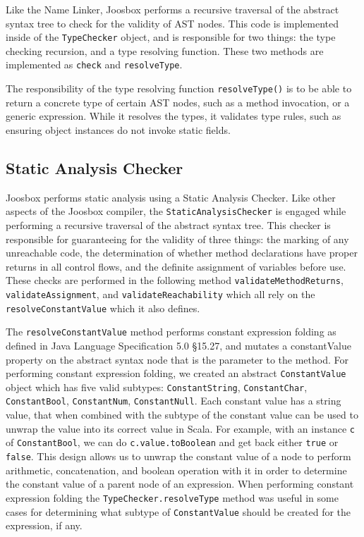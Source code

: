 \documentclass[letterpaper]{article}
\begin{document}
  Like the Name Linker, Joosbox performs a recursive traversal of the abstract
  syntax tree to check for the validity of AST nodes. This code is implemented
  inside of the {\tt TypeChecker} object, and is responsible for two things: the
  type checking recursion, and a type resolving function. These two methods are
  implemented as {\tt check} and {\tt resolveType}.

  The responsibility of the type resolving function {\tt resolveType()} is to be
  able to return a concrete type of certain AST nodes, such as a method
  invocation, or a generic expression. While it resolves the types, it validates
  type rules, such as ensuring object instances do not invoke static fields.


  \subsection{Static Analysis Checker}

  Joosbox performs static analysis using a Static Analysis Checker. Like other
  aspects of the Joosbox compiler, the {\tt StaticAnalysisChecker} is engaged 
  while performing a recursive traversal of the abstract syntax tree. This
  checker is responsible for guaranteeing for the validity of three things: the
  marking of any unreachable code, the determination of whether method
  declarations have proper returns in all control flows, and the definite
  assignment of variables before use. These checks are performed in the
  following method {\tt validateMethodReturns},
  {\tt validateAssignment}, and {\tt validateReachability}
  which all rely on the {\tt resolveConstantValue} which it also defines.

  The {\tt resolveConstantValue} method performs constant expression folding as
  defined in  Java Language Specification 5.0 \S 15.27, and mutates a
  constantValue property on the abstract syntax node that is the parameter to
  the method. For performing constant expression folding, we created an abstract
  {\tt ConstantValue} object which has five valid subtypes: {\tt ConstantString},
  {\tt ConstantChar}, {\tt ConstantBool}, {\tt ConstantNum}, {\tt ConstantNull}.
  Each constant value has a string value, that when combined with the subtype of
  the constant value can be used to unwrap the value into its correct value in
  Scala. For example, with an instance {\tt c} of {\tt ConstantBool}, we can do
  {\tt c.value.toBoolean} and get back either {\tt true} or {\tt false}. This
  design allows us to unwrap the constant value of a node to perform arithmetic,
  concatenation, and boolean operation with it in order to determine the
  constant value of a parent node of an expression. When performing constant
  expression folding the {\tt TypeChecker.resolveType} method was useful in some
  cases for determining what subtype of {\tt ConstantValue} should be created for
  the expression, if any.
\end{document}
